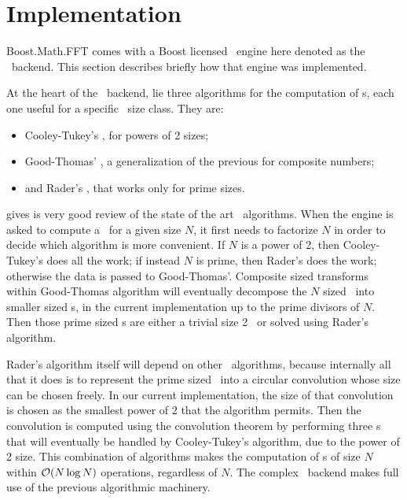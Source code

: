 \section{Implementation}
Boost.Math.FFT comes with a Boost licensed \fft\ engine here denoted as the
\bsl\ backend. This section describes briefly how that engine was implemented.

At the heart of the \bsl\ backend, lie three algorithms for the computation of
\dft s, each one useful for a specific \dft\ size class. They are:
\begin{itemize}
    \item Cooley-Tukey's \fft, for powers of 2 sizes;
    \item Good-Thomas' \fft, a generalization of the previous for composite
    numbers;
    \item and Rader's \fft, that works only for prime sizes.
\end{itemize}
\cite{duhamel1990} gives is very good review of the state of the art \fft\
algorithms.
When the engine is asked to compute a \dft\ for a given size $N$, it first needs
to factorize $N$ in order to decide which algorithm is more convenient.
If $N$ is a power of 2, then Cooley-Tukey's does all the work; if instead $N$
is prime, then Rader's does the work; otherwise the data is passed to
Good-Thomas'. Composite sized transforms within Good-Thomas algorithm will
eventually decompose the $N$ sized \dft\ into smaller sized \dft s, in the
current implementation up to the prime divisors of $N$. Then those prime sized
\dft s are either a trivial size 2 \dft\ or solved using Rader's algorithm.

Rader's algorithm itself will depend on other \fft\ algorithms, because
internally all that it does is to represent the prime sized \dft\ into a 
circular convolution whose size can be chosen freely. In our current
implementation, the size of that convolution is chosen as the smallest power of
2 that the algorithm permits. Then the convolution is computed using the
convolution theorem by performing three \fft s that will eventually be handled
by Cooley-Tukey's algorithm, due to the power of 2 size.
This combination of algorithms makes the computation of \dft s of size
$N$ within $\mathcal{O}(N \log N)$ operations, regardless of $N$.
The complex \bsl\ backend makes full use of the previous algorithmic machinery.

